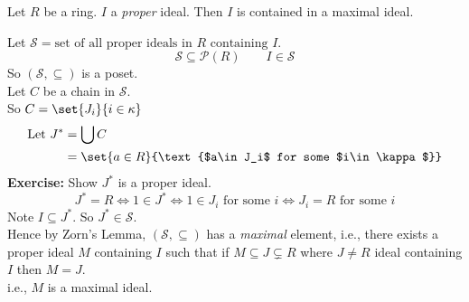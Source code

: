 \thm Let $R$ be a ring.  $I$ a \emph{proper} ideal.  Then $I$ is contained in a maximal ideal.

\pf Let $\mathcal{S}=\text{set of all proper ideals in $R$ containing $I$}$.
\[ \mathcal{S}\subseteq\mathcal{P}(R) \qquad I \in \mathcal{S} \]
So $(\mathcal S, \subseteq)$ is a poset. \\
Let $C$ be a chain in $\mathcal S$. \\
So $C=\set{J_i}{i\in\kappa}$
\begin{align*}
\text{Let } J^* &= \bigcup C \\
&= \set{a\in R}{\text{$a\in J_i$ for some $i\in\kappa$}}
\end{align*}
\textbf{Exercise:} Show $J^*$ is a proper ideal.
\[ J^* = R \iff 1\in J^* \iff \text{$1\in J_i$ for some $i$} \iff \text{$J_i=R$ for some $i$} \]
Note $I\subseteq J^*$.  So $J^*\in\mathcal S$. \\
Hence by Zorn's Lemma, $(\mathcal S,\subseteq)$ has a \emph{maximal} element, i.e., there exists a proper ideal $M$ containing $I$ such that if $M\subseteq J\subsetneq R$ where $J\neq R$ ideal containing $I$ then $M=J$. \\
i.e., $M$ is a maximal ideal.